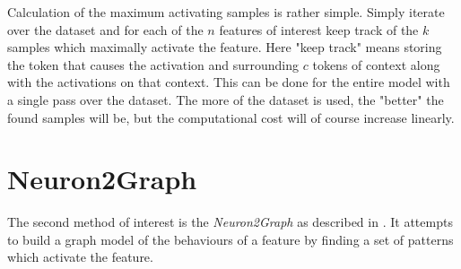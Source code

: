 \documentclass[../main.tex]{subfiles}
\begin{document}
Calculation of the maximum activating samples is rather simple.
Simply iterate over the dataset 
and for each of the $n$ features of interest 
keep track of the $k$ samples which maximally activate the feature.
Here "keep track" means storing the token that causes the activation and 
surrounding $c$ tokens of context along with the activations on that context.
This can be done for the entire model with a single pass over the dataset.
The more of the dataset is used, the "better" the found samples will be, 
but the computational cost will of course increase linearly.

\section{Neuron2Graph}
The second method of interest is the \emph{Neuron2Graph} 
as described in \citet{foote_neuron_2023}.
It attempts to build a graph model of the behaviours of a feature 
by finding a set of patterns which activate the feature.

\end{document}
